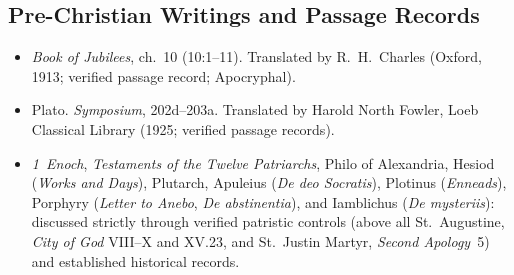 \subsection{Pre-Christian Writings and Passage Records}
\begin{itemize}
\item \emph{Book of Jubilees}, ch.~10 (10:1--11). Translated by R.~H.~Charles (Oxford, 1913; verified passage record; Apocryphal).
\item Plato. \emph{Symposium}, 202d--203a. Translated by Harold North Fowler, Loeb Classical Library (1925; verified passage records).
\item \emph{1~Enoch}, \emph{Testaments of the Twelve Patriarchs}, Philo of Alexandria, Hesiod (\emph{Works and Days}), Plutarch, Apuleius (\emph{De deo Socratis}), Plotinus (\emph{Enneads}), Porphyry (\emph{Letter to Anebo}, \emph{De abstinentia}), and Iamblichus (\emph{De mysteriis}): discussed strictly through verified patristic controls (above all St.~Augustine, \emph{City of God} VIII--X and XV.23, and St.~Justin Martyr, \emph{Second Apology}~5) and established historical records.
\end{itemize}

